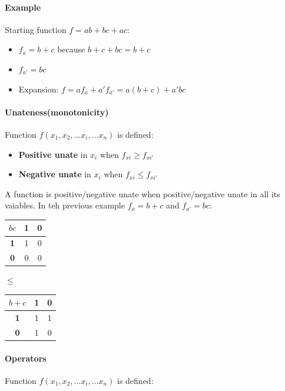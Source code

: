 \paragraph{Example} Starting function $f = ab + bc + ac$:

\begin{itemize}
	\item $f_{a} = b+c$ because $b+c+bc = b+c$
	\item $f_{a'} = bc$
	\item Expansion: $f = af_{a} + a'f_{a'} = a(b+c) + a'bc$
\end{itemize}

\paragraph{Unateness(monotonicity)} Function $f(x_{1}, x_{2},...x_{i},... x_{n})$ is defined:

\begin{itemize}
	\item \textbf{Positive unate} in $x_{i}$ when $ f_{xi} \geq f_{xi'} $ 
	\item \textbf{Negative unate} in $x_{i}$ when $ f_{xi} \leq f_{xi'} $ 
\end{itemize}
A function is positive/negative unate when positive/negative unate in all its vaiables. In teh previous example $f_{a} = b+c$ and $f_{a'} = bc$:

\begin{center}
	\begin{tabular}{c | c | c |}
		
		$bc$ & \textbf{1} & \textbf{0} \\ \hline
		\textbf{1} & 1 & 0 \\ \hline 
		\textbf{0} & 0 & 0 \\ \hline  
		
		\hline
	\end{tabular}
	\quad
	\quad
	$ \leq $
	\quad
	\quad
	\begin{tabular}{ c | c | c |}
		$b + c$ & \textbf{1} & \textbf{0} \\ \hline
		\textbf{1} & 1 & 1 \\ \hline 
		\textbf{0} & 1 & 0 \\ \hline  
	\end{tabular}
\end{center}

\paragraph{Operators} Function $f(x_{1}, x_{2},...x_{i},... x_{n})$ is defined:

